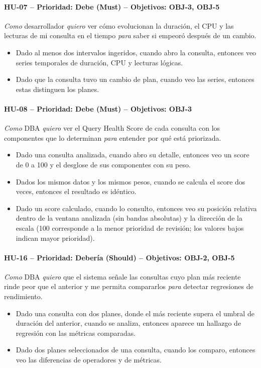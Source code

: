 \documentclass[11pt,a4paper]{report}
\begin{document}
\paragraph{HU-07 -- Prioridad: Debe (Must) -- Objetivos: OBJ-3, OBJ-5}
\textit{Como} desarrollador \textit{quiero} ver cómo evolucionan la duración, el CPU y las lecturas de mi consulta en el tiempo \textit{para} saber si empeoró después de un cambio.
\begin{itemize}[leftmargin=1.3em,itemsep=1pt]
\item[\textbf{CA-HU07.1}] Dado al menos dos intervalos ingeridos, cuando abro la consulta, entonces veo series temporales de duración, CPU y lecturas lógicas.
\item[\textbf{CA-HU07.2}] Dado que la consulta tuvo un cambio de plan, cuando veo las series, entonces estas distinguen los planes.
\end{itemize}

\paragraph{HU-08 -- Prioridad: Debe (Must) -- Objetivos: OBJ-3}
\textit{Como} DBA \textit{quiero} ver el Query Health Score de cada consulta con los componentes que lo determinan \textit{para} entender por qué está priorizada.
\begin{itemize}[leftmargin=1.3em,itemsep=1pt]
\item[\textbf{CA-HU08.1}] Dado una consulta analizada, cuando abro su detalle, entonces veo un score de 0 a 100 y el desglose de sus componentes con su peso.
\item[\textbf{CA-HU08.2}] Dados los mismos datos y los mismos pesos, cuando se calcula el score dos veces, entonces el resultado es idéntico.
\item[\textbf{CA-HU08.3}] Dado un score calculado, cuando lo consulto, entonces veo su posición relativa dentro de la ventana analizada (sin bandas absolutas) y la dirección de la escala (100 corresponde a la menor prioridad de revisión; los valores bajos indican mayor prioridad).
\end{itemize}

\paragraph{HU-16 -- Prioridad: Debería (Should) -- Objetivos: OBJ-2, OBJ-5}
\textit{Como} DBA \textit{quiero} que el sistema señale las consultas cuyo plan más reciente rinde peor que el anterior y me permita compararlos \textit{para} detectar regresiones de rendimiento.
\begin{itemize}[leftmargin=1.3em,itemsep=1pt]
\item[\textbf{CA-HU16.1}] Dado una consulta con dos planes, donde el más reciente supera el umbral de duración del anterior, cuando se analiza, entonces aparece un hallazgo de regresión con las métricas comparadas.
\item[\textbf{CA-HU16.2}] Dado dos planes seleccionados de una consulta, cuando los comparo, entonces veo las diferencias de operadores y de métricas.
\end{itemize}
\end{document}
